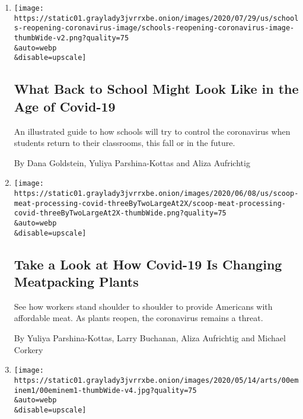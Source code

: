 \begin{enumerate}
\def\labelenumi{\arabic{enumi}.}
\item
  \href{/interactive/2020/07/29/us/schools-reopening-coronavirus.html}{}

  \texttt{[image: https://static01.graylady3jvrrxbe.onion/images/2020/07/29/us/schools-reopening-coronavirus-image/schools-reopening-coronavirus-image-thumbWide-v2.png?quality=75\\\&auto=webp\\\&disable=upscale]}

  \hypertarget{what-back-to-school-might-look-like-in-the-age-of-covid-19}{%
  \subsection{What Back to School Might Look Like in the Age of
  Covid-19}\label{what-back-to-school-might-look-like-in-the-age-of-covid-19}}

  An illustrated guide to how schools will try to control the
  coronavirus when students return to their classrooms, this fall or in
  the future.

  By Dana Goldstein, Yuliya Parshina-Kottas and Aliza Aufrichtig
\item
  \href{/interactive/2020/06/08/us/meat-processing-plants-coronavirus.html}{}

  \texttt{[image: https://static01.graylady3jvrrxbe.onion/images/2020/06/08/us/scoop-meat-processing-covid-threeByTwoLargeAt2X/scoop-meat-processing-covid-threeByTwoLargeAt2X-thumbWide.png?quality=75\\\&auto=webp\\\&disable=upscale]}

  \hypertarget{take-a-look-at-how-covid-19-is-changing-meatpacking-plants}{%
  \subsection{Take a Look at How Covid-19 Is Changing Meatpacking
  Plants}\label{take-a-look-at-how-covid-19-is-changing-meatpacking-plants}}

  See how workers stand shoulder to shoulder to provide Americans with
  affordable meat. As plants reopen, the coronavirus remains a threat.

  By Yuliya Parshina-Kottas, Larry Buchanan, Aliza Aufrichtig and
  Michael Corkery
\item
  \href{/interactive/2020/05/18/arts/music/eminem-marshall-mathers-lp.html}{}

  \texttt{[image: https://static01.graylady3jvrrxbe.onion/images/2020/05/14/arts/00eminem1/00eminem1-thumbWide-v4.jpg?quality=75\\\&auto=webp\\\&disable=upscale]}


\end{enumerate}
